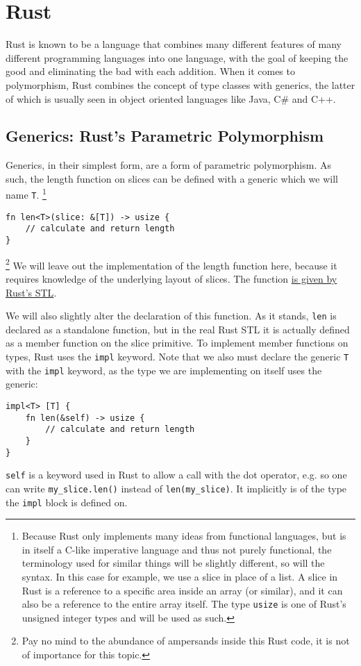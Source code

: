 \section{Rust}

Rust is known to be a language that combines many different features of many different programming languages into one language, with the goal of keeping the good and eliminating the bad with each addition.
When it comes to polymorphism, Rust combines the concept of type classes with generics, the latter of which is usually seen in object oriented languages like Java, C\# and C++.

\subsection{Generics: Rust's Parametric Polymorphism}

Generics, in their simplest form, are a form of parametric polymorphism. As such, the length function on slices can be defined with a generic which we will name \verb|T|.
\footnote{Because Rust only implements many ideas from functional languages, but is in itself a C-like imperative language and thus not purely functional, the terminology used for similar things will be slightly different, so will the syntax. In this case for example, we use a slice in place of a list. A slice in Rust is a reference to a specific area inside an array (or similar), and it can also be a reference to the entire array itself. The type \verb|usize| is one of Rust's unsigned integer types and will be used as such.}
\begin{verbatim}
fn len<T>(slice: &[T]) -> usize {
    // calculate and return length
}
\end{verbatim}
\footnote{Pay no mind to the abundance of ampersands inside this Rust code, it is not of importance for this topic.}
We will leave out the implementation of the length function here, because it requires knowledge of the underlying layout of slices. The function \href{https://doc.rust-lang.org/std/primitive.slice.html#method.len}{is given by Rust's STL}.

We will also slightly alter the declaration of this function. As it stands, \verb|len| is declared as a standalone function, but in the real Rust STL it is actually defined as a member function on the slice primitive. To implement member functions on types, Rust uses the \verb|impl| keyword. Note that we also must declare the generic \verb|T| with the \verb|impl| keyword, as the type we are implementing on itself uses the generic:
\begin{verbatim}
impl<T> [T] {
    fn len(&self) -> usize {
        // calculate and return length
    }
}
\end{verbatim}
\verb|self| is a keyword used in Rust to allow a call with the dot operator, e.g. so one can write \verb|my_slice.len()| instead of \verb|len(my_slice)|. It implicitly is of the type the \verb|impl| block is defined on.

